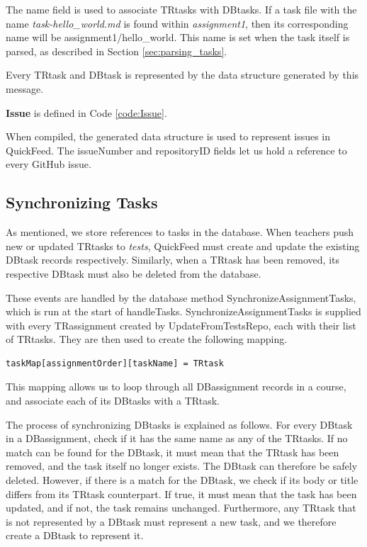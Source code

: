 The name field is used to associate TRtasks with DBtasks.
If a task file with the name \textit{task-hello\_world.md} is found within \textit{assignment1}, then its corresponding name will be assignment1/hello\_world.
This name is set when the task itself is parsed, as described in Section \ref{sec:parsing_tasks}.

Every TRtask and DBtask is represented by the data structure generated by this message.

\textbf{Issue} is defined in Code \ref{code:Issue}.



When compiled, the generated data structure is used to represent issues in QuickFeed.
The issueNumber and repositoryID fields let us hold a reference to every GitHub issue.

\subsection{Synchronizing Tasks}

As mentioned, we store references to tasks in the database.
When teachers push new or updated TRtasks to \textit{tests}, QuickFeed must create and update the existing DBtask records respectively.
Similarly, when a TRtask has been removed, its respective DBtask must also be deleted from the database.

These events are handled by the database method SynchronizeAssignmentTasks, which is run at the start of handleTasks.
SynchronizeAssignmentTasks is supplied with every TRassignment created by UpdateFromTestsRepo, each with their list of TRtasks.
They are then used to create the following mapping.
\begin{lstlisting}[caption={Task mapping}, language=Golang, label={code:task-mapping}, numbers=none, basicstyle=\ttfamily\footnotesize]
taskMap[assignmentOrder][taskName] = TRtask
\end{lstlisting}
This mapping allows us to loop through all DBassignment records in a course, and associate each of its DBtasks with a TRtask.

The process of synchronizing DBtasks is explained as follows.
For every DBtask in a DBassignment, check if it has the same name as any of the TRtasks.
If no match can be found for the DBtask, it must mean that the TRtask has been removed, and the task itself no longer exists.
The DBtask can therefore be safely deleted.
However, if there is a match for the DBtask, we check if its body or title differs from its TRtask counterpart.
If true, it must mean that the task has been updated, and if not, the task remains unchanged.
Furthermore, any TRtask that is not represented by a DBtask must represent a new task, and we therefore create a DBtask to represent it.

